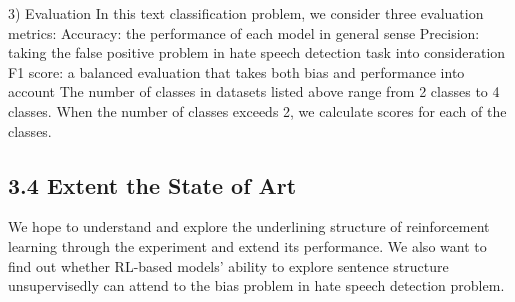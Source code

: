 \documentclass[10pt]{article}
\begin{document}
3) Evaluation
In this text classification problem, we consider three evaluation metrics: 
Accuracy: the performance of each model in general sense
Precision: taking the false positive problem in hate speech detection task into consideration
F1 score: a balanced evaluation that takes both bias and performance into account
The number of classes in datasets listed above range from 2 classes to 4 classes. When the number of classes exceeds 2, we calculate scores for each of the classes.

\subsection*{3.4 Extent the State of Art}
We hope to understand and explore the underlining structure of reinforcement learning through the experiment and extend its performance. We also want to find out whether RL-based models’ ability to explore sentence structure unsupervisedly can attend to the bias problem in hate speech detection problem.



\end{document}
